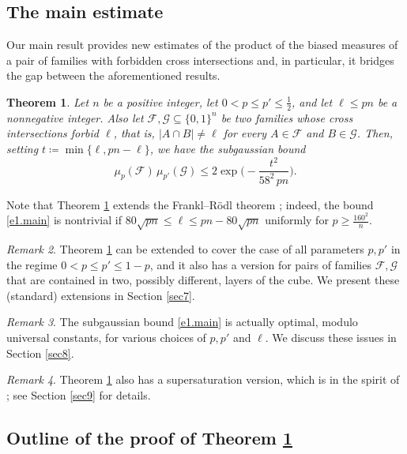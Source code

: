 \documentclass[10pt]{amsart}
\newtheorem{thm}{Theorem}[section]
\theoremstyle{remark}
\newtheorem{rem}[thm]{Remark}
\newcommand{\meg}{\geqslant}
\newcommand{\mik}{\leqslant}
\newcommand{\Fcal}{\mathcal{F}}
\newcommand{\Gcal}{\mathcal{G}}
\begin{document}
\subsection{The main estimate} \label{subsec1.2}

Our main result provides new estimates of the product of the biased measures of a pair of families
with forbidden cross intersections and, in particular, it bridges the gap between the aforementioned results.
\begin{thm} \label{main}
Let $n$ be a positive integer, let $0<p\mik p'\mik \frac12$, and let $\ell\mik pn$ be a nonnegative integer.
Also let $\Fcal,\Gcal\subseteq \{0,1\}^n$ be two families whose cross intersections forbid $\ell$, that is,
$|A\cap B|\neq \ell$ for every $A\in\Fcal$ and $B\in\Gcal$. Then, setting $t\coloneqq \min\{\ell,pn-\ell\}$,
we have the subgaussian bound
\begin{equation} \label{e1.main}
\mu_p(\Fcal)\, \mu_{p'}(\Gcal) \mik 2\exp\Big( - \frac{t^2}{58^2\, pn}\Big).
\end{equation}
\end{thm}
Note that Theorem \ref{main} extends the Frankl--R\"{o}dl theorem \cite[Theorem 1.5]{FR87};
indeed, the bound \eqref{e1.main} is nontrivial if $80\sqrt{pn}\mik \ell \mik pn-80\sqrt{pn}$
uniformly for $p\meg \frac{160^2}{n}$.
\begin{rem} \label{r1.2}
Theorem \ref{main} can be extended to cover the case of all parameters $p,p'$ in the regime
$0<p\mik p'\mik 1-p$, and it also has a version for pairs of families $\Fcal,\Gcal$ that are contained
in two, possibly different, layers of the cube. We present these (standard) extensions in Section \ref{sec7}.
\end{rem}
\begin{rem} \label{r1.3}
The subgaussian bound \eqref{e1.main} is actually optimal, modulo universal constants,
for various choices of $p,p'$ and $\ell$. We discuss these issues in Section \ref{sec8}.
\end{rem}
\begin{rem} \label{r1.4}
Theorem \ref{main} also has a supersaturation version, which is in the spirit of
\cite[Theorem 1.14]{FR87}; see Section \ref{sec9} for details.
\end{rem}

\subsection{Outline of the proof of Theorem \ref{main}} \label{subsec1.3}
\end{document}
